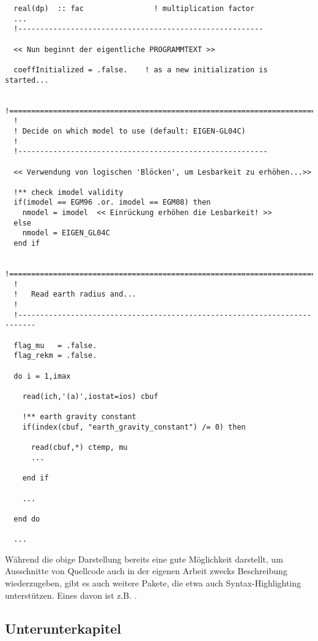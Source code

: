 \begin{verbatim}
  real(dp)  :: fac                ! multiplication factor
  ...
  !--------------------------------------------------------
  
  << Nun beginnt der eigentliche PROGRAMMTEXT >>
    
  coeffInitialized = .false.    ! as a new initialization is started...

  !============================================================================
  !
  ! Decide on which model to use (default: EIGEN-GL04C)
  ! 
  !---------------------------------------------------------
  
  << Verwendung von logischen 'Blöcken', um Lesbarkeit zu erhöhen...>>
  
  !** check imodel validity
  if(imodel == EGM96 .or. imodel == EGM08) then
    nmodel = imodel  << Einrückung erhöhen die Lesbarkeit! >>
  else
    nmodel = EIGEN_GL04C
  end if

  !============================================================================
  !
  !   Read earth radius and...
  !
  !--------------------------------------------------------------------------

  flag_mu   = .false.
  flag_rekm = .false.

  do i = 1,imax

    read(ich,'(a)',iostat=ios) cbuf
      
    !** earth gravity constant
    if(index(cbuf, "earth_gravity_constant") /= 0) then

      read(cbuf,*) ctemp, mu
      ...
      
    end if
    
    ...
    
  end do
  
  ...

\end{verbatim}

Während die obige Darstellung bereits eine gute Möglichkeit darstellt, um Ausschnitte von Quellcode auch in der eigenen Arbeit zwecks Beschreibung 
wiederzugeben, gibt es auch weitere Pakete, die etwa auch Syntax-Highlighting unterstützen. Eines davon ist z.B. .

\subsection{Unterunterkapitel}
\label{cha:Unterunterkapitel}

